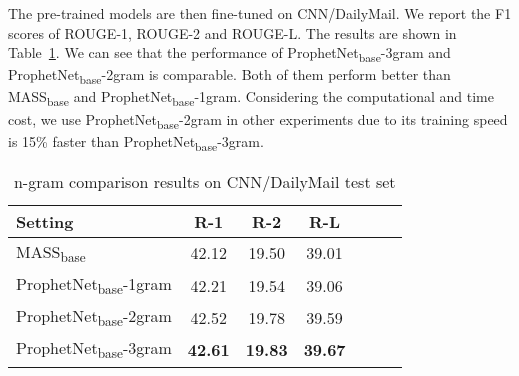 \documentclass[11pt,a4paper]{article}
\begin{document}
The pre-trained models are then fine-tuned on CNN/DailyMail.
We report the F1 scores of ROUGE-1, ROUGE-2 and ROUGE-L. The results are shown in Table~\ref{tab:abngram}. We can see that the performance of ProphetNet\textsubscript{base}-3gram and ProphetNet\textsubscript{base}-2gram is comparable. Both of them perform better than MASS\textsubscript{base} and ProphetNet\textsubscript{base}-1gram. Considering the computational and time cost, we use ProphetNet\textsubscript{base}-2gram in other experiments due to its training speed is 15\% faster than ProphetNet\textsubscript{base}-3gram.

\begin{table}[ht] 
\small
\begin{center}
  \begin{tabular}{lcccccl}
    \toprule
    Setting & R-1 & R-2 & R-L \\
    \midrule
 MASS\textsubscript{base}& 42.12 &19.50&   39.01\\
  ProphetNet\textsubscript{base}-1gram &   42.21  & 19.54   &39.06\\
 ProphetNet\textsubscript{base}-2gram &   42.52  & 19.78   &39.59\\
 ProphetNet\textsubscript{base}-3gram & \textbf{42.61}    & \textbf{19.83} &   \textbf{39.67}\\
  \bottomrule
\end{tabular}
\end{center}
\caption{n-gram comparison results on CNN/DailyMail test set}
\label{tab:abngram}
\end{table}
\end{document}
